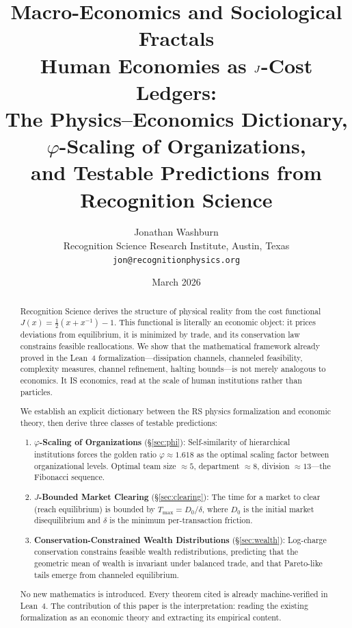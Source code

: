 \documentclass[11pt,a4paper]{article}
\title{\textbf{Macro-Economics and Sociological Fractals}\\[0.3em]
\large Human Economies as $\Jcost$-Cost Ledgers:\\
The Physics--Economics Dictionary,\\
$\varphi$-Scaling of Organizations,\\
and Testable Predictions from Recognition Science}
\author{Jonathan Washburn\\
\small Recognition Science Research Institute, Austin, Texas\\
\small \texttt{jon@recognitionphysics.org}}
\date{March 2026}
\theoremstyle{plain}
\theoremstyle{definition}
\theoremstyle{remark}
\newcommand{\Jcost}{J}
\begin{document}
\maketitle

\begin{abstract}
Recognition Science derives the structure of physical reality from the cost functional $\Jcost(x) = \tfrac{1}{2}(x + x^{-1}) - 1$.
This functional is literally an economic object: it prices deviations from equilibrium, it is minimized by trade, and its conservation law constrains feasible reallocations.
We show that the mathematical framework already proved in the Lean~4 formalization---dissipation channels, channeled feasibility, complexity measures, channel refinement, halting bounds---is not merely analogous to economics.
It IS economics, read at the scale of human institutions rather than particles.

We establish an explicit dictionary between the RS physics formalization and economic theory, then derive three classes of testable predictions:

\begin{enumerate}[nosep]
\item \textbf{$\varphi$-Scaling of Organizations} (\S\ref{sec:phi}): Self-similarity of hierarchical institutions forces the golden ratio $\varphi \approx 1.618$ as the optimal scaling factor between organizational levels.
Optimal team size $\approx 5$, department $\approx 8$, division $\approx 13$---the Fibonacci sequence.

\item \textbf{$\Jcost$-Bounded Market Clearing} (\S\ref{sec:clearing}): The time for a market to clear (reach equilibrium) is bounded by $T_{\max} = D_0/\delta$, where $D_0$ is the initial market disequilibrium and $\delta$ is the minimum per-transaction friction.

\item \textbf{Conservation-Constrained Wealth Distributions} (\S\ref{sec:wealth}): Log-charge conservation constrains feasible wealth redistributions, predicting that the geometric mean of wealth is invariant under balanced trade, and that Pareto-like tails emerge from channeled equilibrium.
\end{enumerate}

No new mathematics is introduced.
Every theorem cited is already machine-verified in Lean~4.
The contribution of this paper is the interpretation: reading the existing formalization as an economic theory and extracting its empirical content.
\end{abstract}
\end{document}
